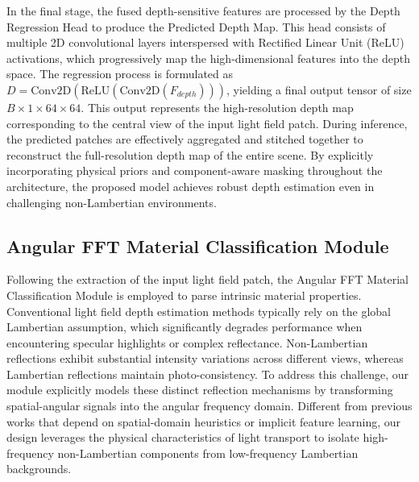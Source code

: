 In the final stage, the fused depth-sensitive features are processed by the Depth Regression Head to produce the Predicted Depth Map. This head consists of multiple 2D convolutional layers interspersed with Rectified Linear Unit (ReLU) activations, which progressively map the high-dimensional features into the depth space. The regression process is formulated as $D = \text{Conv2D}(\text{ReLU}(\text{Conv2D}(F_{depth})))$, yielding a final output tensor of size $B \times 1 \times 64 \times 64$. This output represents the high-resolution depth map corresponding to the central view of the input light field patch. During inference, the predicted patches are effectively aggregated and stitched together to reconstruct the full-resolution depth map of the entire scene. By explicitly incorporating physical priors and component-aware masking throughout the architecture, the proposed model achieves robust depth estimation even in challenging non-Lambertian environments.

\subsection{Angular FFT Material Classification Module}

Following the extraction of the input light field patch, the Angular FFT Material Classification Module is employed to parse intrinsic material properties. Conventional light field depth estimation methods typically rely on the global Lambertian assumption, which significantly degrades performance when encountering specular highlights or complex reflectance. Non-Lambertian reflections exhibit substantial intensity variations across different views, whereas Lambertian reflections maintain photo-consistency. To address this challenge, our module explicitly models these distinct reflection mechanisms by transforming spatial-angular signals into the angular frequency domain. Different from previous works that depend on spatial-domain heuristics or implicit feature learning, our design leverages the physical characteristics of light transport to isolate high-frequency non-Lambertian components from low-frequency Lambertian backgrounds.

